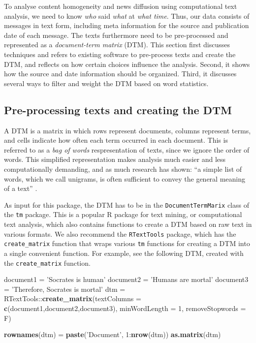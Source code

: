 \documentclass[]{article}
\newenvironment{Shaded}{\begin{snugshade}}{\end{snugshade}}
\newcommand{\KeywordTok}[1]{\textcolor[rgb]{0.13,0.29,0.53}{\textbf{{#1}}}}
\newcommand{\DataTypeTok}[1]{\textcolor[rgb]{0.13,0.29,0.53}{{#1}}}
\newcommand{\DecValTok}[1]{\textcolor[rgb]{0.00,0.00,0.81}{{#1}}}
\newcommand{\StringTok}[1]{\textcolor[rgb]{0.31,0.60,0.02}{{#1}}}
\newcommand{\NormalTok}[1]{{#1}}
\begin{document}
To analyse content homogeneity and news diffusion using computational
text analysis, we need to know \emph{who} said \emph{what} at \emph{what
time}. Thus, our data consists of messages in text form, including meta
information for the source and publication date of each message. The
texts furthermore need to be pre-processed and represented as a
\emph{document-term matrix} (DTM). This section first discusses
techniques and refers to existing software to pre-process texts and
create the DTM, and reflects on how certain choices influence the
analysis. Second, it shows how the source and date information should be
organized. Third, it discusses several ways to filter and weight the DTM
based on word statistics.

\subsection{Pre-processing texts and creating the
DTM}\label{pre-processing-texts-and-creating-the-dtm}

A DTM is a matrix in which rows represent documents, columns represent
terms, and cells indicate how often each term occurred in each document.
This is referred to as a \emph{bag of words} respresentation of texts,
since we ignore the order of words. This simplified representation makes
analysis much easier and less computationally demanding, and as much
research has shown: ``a simple list of words, which we call unigrams, is
often sufficient to convey the general meaning of a text''
\citep[6]{grimmer13}.

As input for this package, the DTM has to be in the
\texttt{DocumentTermMarix} class of the \texttt{tm} package. This is a
popular R package for text mining, or computational text analysis, which
also contains functions to create a DTM based on raw text in various
formats. We also recommend the \texttt{RTextTools} package, which has
the \texttt{create\_matrix} function that wraps various \texttt{tm}
functions for creating a DTM into a single convenient function. For
example, see the following DTM, created with the \texttt{create\_matrix}
function.

\begin{Shaded}
\begin{Highlighting}[]
\NormalTok{document1 =}\StringTok{ 'Socrates is human'}
\NormalTok{document2 =}\StringTok{ 'Humans are mortal'}
\NormalTok{document3 =}\StringTok{ 'Therefore, Socrates is mortal'}
\NormalTok{dtm =}\StringTok{ }\NormalTok{RTextTools::}\KeywordTok{create_matrix}\NormalTok{(}\DataTypeTok{textColumns =} \KeywordTok{c}\NormalTok{(document1,document2,document3), }
                                \DataTypeTok{minWordLength =} \DecValTok{1}\NormalTok{, }\DataTypeTok{removeStopwords =} \NormalTok{F)}

\KeywordTok{rownames}\NormalTok{(dtm) =}\StringTok{ }\KeywordTok{paste}\NormalTok{(}\StringTok{'Document'}\NormalTok{, }\DecValTok{1}\NormalTok{:}\KeywordTok{nrow}\NormalTok{(dtm))}
\KeywordTok{as.matrix}\NormalTok{(dtm)}
\end{Highlighting}
\end{Shaded}
\end{document}
